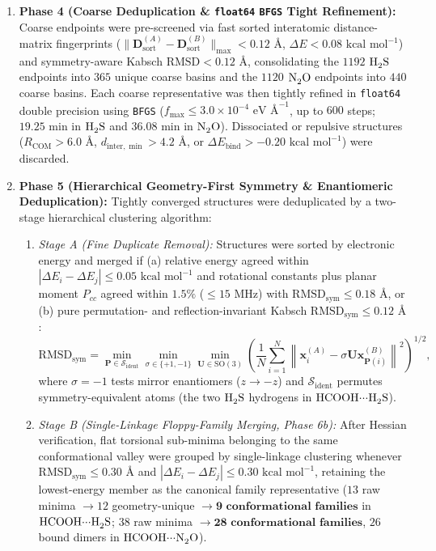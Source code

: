 \documentclass[journal=jpclcd,manuscript=article]{achemso}
\begin{document}
\begin{enumerate}
  \item \textbf{Phase 4 (Coarse Deduplication \& \texttt{float64} \texttt{BFGS} Tight Refinement):} Coarse endpoints were pre-screened via fast sorted interatomic distance-matrix fingerprints ($\|\mathbf{D}_{\mathrm{sort}}^{(A)} - \mathbf{D}_{\mathrm{sort}}^{(B)}\|_{\max} < 0.12\text{ \AA}$, $\Delta E < 0.08\text{ kcal mol}^{-1}$) and symmetry-aware Kabsch $\mathrm{RMSD} < 0.12\text{ \AA}$, consolidating the $1192$ $\ce{H2S}$ endpoints into $365$ unique coarse basins and the $1120$ $\ce{N2O}$ endpoints into $440$ coarse basins. Each coarse representative was then tightly refined in \texttt{float64} double precision using \texttt{BFGS} ($f_{\max} \le 3.0\times 10^{-4}\text{ eV \AA}^{-1}$, up to $600$ steps; $19.25\text{ min}$ in $\ce{H2S}$ and $36.08\text{ min}$ in $\ce{N2O}$). Dissociated or repulsive structures ($R_{\mathrm{COM}} > 6.0\text{ \AA}$, $d_{\mathrm{inter},\min} > 4.2\text{ \AA}$, or $\Delta E_{\mathrm{bind}} > -0.20\text{ kcal mol}^{-1}$) were discarded.
  \item \textbf{Phase 5 (Hierarchical Geometry-First Symmetry \& Enantiomeric Deduplication):} Tightly converged structures were deduplicated by a two-stage hierarchical clustering algorithm:
  \begin{enumerate}
    \item \textit{Stage A (Fine Duplicate Removal):} Structures were sorted by electronic energy and merged if (a) relative energy agreed within $|\Delta E_i - \Delta E_j| \le 0.05\text{ kcal mol}^{-1}$ and rotational constants plus planar moment $P_{cc}$ agreed within $1.5\%$ ($\le 15\text{ MHz}$) with $\mathrm{RMSD}_{\mathrm{sym}} \le 0.18\text{ \AA}$, or (b) pure permutation- and reflection-invariant Kabsch $\mathrm{RMSD}_{\mathrm{sym}} \le 0.12\text{ \AA}$ \cite{Kabsch1976}:
    \begin{equation}
      \mathrm{RMSD}_{\mathrm{sym}} = \min_{\mathbf{P} \in \mathcal{S}_{\mathrm{ident}}} \min_{\sigma \in \{+1,-1\}} \min_{\mathbf{U} \in \mathrm{SO}(3)} \left( \frac{1}{N}\sum_{i=1}^N \left\|\mathbf{x}_i^{(A)} - \sigma\mathbf{U}\mathbf{x}_{\mathbf{P}(i)}^{(B)}\right\|^2 \right)^{1/2},
    \end{equation}
    where $\sigma = -1$ tests mirror enantiomers ($z \to -z$) and $\mathcal{S}_{\mathrm{ident}}$ permutes symmetry-equivalent atoms (the two $\ce{H2S}$ hydrogens in $\ce{HCOOH\bond{...}H2S}$).
    \item \textit{Stage B (Single-Linkage Floppy-Family Merging, Phase 6b):} After Hessian verification, flat torsional sub-minima belonging to the same conformational valley were grouped by single-linkage clustering whenever $\mathrm{RMSD}_{\mathrm{sym}} \le 0.30\text{ \AA}$ and $|\Delta E_i - \Delta E_j| \le 0.30\text{ kcal mol}^{-1}$, retaining the lowest-energy member as the canonical family representative ($13$ raw minima $\to 12$ geometry-unique $\to \mathbf{9\text{ conformational families}}$ in $\ce{HCOOH\bond{...}H2S}$; $38$ raw minima $\to \mathbf{28\text{ conformational families}}$, $26$ bound dimers in $\ce{HCOOH\bond{...}N2O}$).

\end{enumerate}
\end{enumerate}
\end{document}
